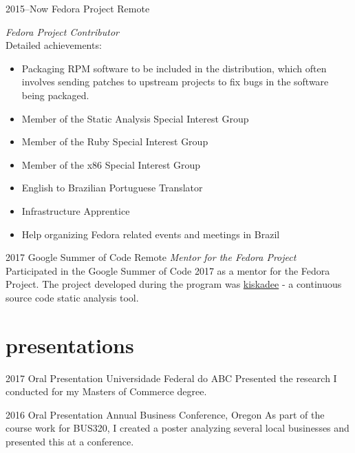 \documentclass[]{friggeri-cv} %
\begin{document}
\begin{entrylist}

\entry
{2015--Now}
{Fedora Project}
{Remote}
{\emph{Fedora Project Contributor} \\
Detailed achievements:
  \begin{itemize}
    \item Packaging RPM software to be included in the distribution, which often involves sending patches to upstream projects to fix bugs in the software being packaged.
    \item Member of the Static Analysis Special Interest Group
    \item Member of the Ruby Special Interest Group
    \item Member of the x86 Special Interest Group
    \item English to Brazilian Portuguese Translator
    \item Infrastructure Apprentice
    \item Help organizing Fedora related events and meetings in Brazil
  \end{itemize}}


\entry
{2017}
{Google Summer of Code}
{Remote}
{\emph{Mentor for the Fedora Project} \\
  Participated in the Google Summer of Code 2017 as a mentor for the Fedora Project. The project developed during the program was \href{pagure.io/kiskadee}{kiskadee} - a continuous source code static analysis tool. \\
 }


\end{entrylist}


\section{presentations}

\begin{entrylist}


\entry
{2017}
{Oral Presentation}
{Universidade Federal do ABC}
{Presented the research I conducted for my Masters of Commerce degree.}


\entry
{2016}
{Oral Presentation}
{Annual Business Conference, Oregon}
{As part of the course work for BUS320, I created a poster analyzing several local businesses and presented this at a conference.}


\end{entrylist}
\end{document}
